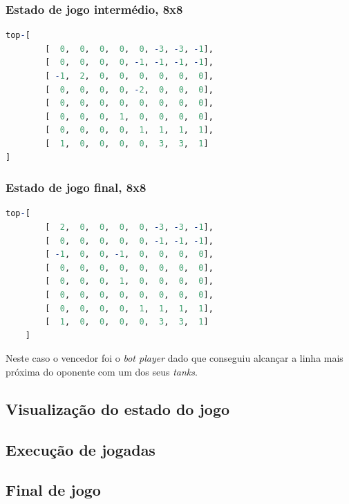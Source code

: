 \documentclass[a4paper,11pt,portuguese]{article}
\begin{document}
    \subsubsection{Estado de jogo intermédio, 8x8}
\begin{lstlisting}[language=prolog]
top-[
        [  0,  0,  0,  0,  0, -3, -3, -1],
        [  0,  0,  0,  0, -1, -1, -1, -1],
        [ -1,  2,  0,  0,  0,  0,  0,  0],
        [  0,  0,  0,  0, -2,  0,  0,  0],
        [  0,  0,  0,  0,  0,  0,  0,  0],
        [  0,  0,  0,  1,  0,  0,  0,  0],
        [  0,  0,  0,  0,  1,  1,  1,  1],
        [  1,  0,  0,  0,  0,  3,  3,  1]
]
\end{lstlisting}

    \subsubsection{Estado de jogo final, 8x8}
\begin{lstlisting}[language=prolog]
top-[
        [  2,  0,  0,  0,  0, -3, -3, -1],
        [  0,  0,  0,  0,  0, -1, -1, -1],
        [ -1,  0,  0, -1,  0,  0,  0,  0],
        [  0,  0,  0,  0,  0,  0,  0,  0],
        [  0,  0,  0,  1,  0,  0,  0,  0],
        [  0,  0,  0,  0,  0,  0,  0,  0],
        [  0,  0,  0,  0,  1,  1,  1,  1],
        [  1,  0,  0,  0,  0,  3,  3,  1]
    ]
\end{lstlisting}

    \noindent Neste caso o vencedor foi o \textit{bot player} dado que conseguiu
    alcançar a linha mais próxima do oponente com um dos seus \textit{tanks}.

    \subsection{Visualização do estado do jogo}



    \subsection{Execução de jogadas}



    \subsection{Final de jogo}

\end{document}
